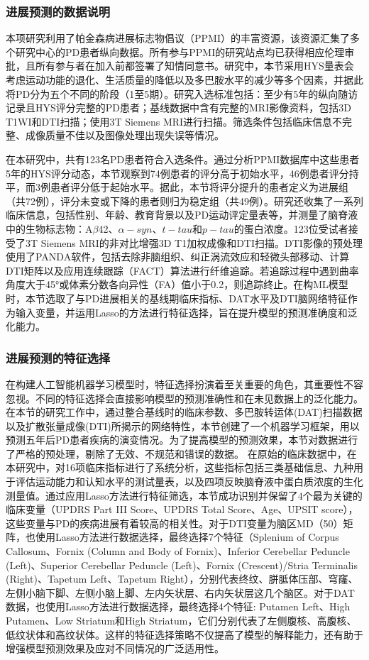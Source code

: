 \subsubsection{进展预测的数据说明}
本项研究利用了帕金森病进展标志物倡议（PPMI）的丰富资源，该资源汇集了多个研究中心的PD患者纵向数据。所有参与PPMI的研究站点均已获得相应伦理审批，且所有参与者在加入前都签署了知情同意书。研究中，本节采用HYS量表会考虑运动功能的退化、生活质量的降低以及多巴胺水平的减少等多个因素，并据此将PD分为五个不同的阶段（1至5期）。研究入选标准包括：至少有5年的纵向随访记录且HYS评分完整的PD患者；基线数据中含有完整的MRI影像资料，包括3D T1WI和DTI扫描；使用3T Siemens MRI进行扫描。筛选条件包括临床信息不完整、成像质量不佳以及图像处理出现失误等情况。

在本研究中，共有123名PD患者符合入选条件。通过分析PPMI数据库中这些患者5年的HYS评分动态，本节观察到74例患者的评分高于初始水平，46例患者评分持平，而3例患者评分低于起始水平。据此，本节将评分提升的患者定义为进展组（共72例），评分未变或下降的患者则归为稳定组（共49例）。研究还收集了一系列临床信息，包括性别、年龄、教育背景以及PD运动评定量表等，并测量了脑脊液中的生物标志物：A$\beta$42、$\alpha-syn$、$t-tau$和$p-tau$的蛋白浓度。123位受试者接受了3T Siemens MRI的非对比增强3D T1加权成像和DTI扫描。DTI影像的预处理使用了PANDA软件，包括去除非脑组织、纠正涡流效应和轻微头部移动、计算DTI矩阵以及应用连续跟踪（FACT）算法进行纤维追踪。若追踪过程中遇到曲率角度大于45°或体素分数各向异性（FA）值小于0.2，则追踪终止。在构ML模型时，本节选取了与PD进展相关的基线期临床指标、DAT水平及DTI脑网络特征作为输入变量，并运用Lasso的方法进行特征选择，旨在提升模型的预测准确度和泛化能力。


\subsubsection{进展预测的特征选择} 
在构建人工智能机器学习模型时，特征选择扮演着至关重要的角色，其重要性不容忽视。不同的特征选择会直接影响模型的预测准确性和在未见数据上的泛化能力。在本节的研究工作中，通过整合基线时的临床参数、多巴胺转运体(DAT)扫描数据以及扩散张量成像(DTI)所揭示的网络特性，本节创建了一个机器学习框架，用以预测五年后PD患者疾病的演变情况。为了提高模型的预测效果，本节对数据进行了严格的预处理，剔除了无效、不规范和错误的数据。
在原始的临床数据中，在本研究中，对16项临床指标进行了系统分析，这些指标包括三类基础信息、九种用于评估运动能力和认知水平的测试量表，以及四项反映脑脊液中蛋白质浓度的生化测量值。通过应用Lasso方法进行特征筛选，本节成功识别并保留了4个最为关键的临床变量（UPDRS Part III Score、UPDRS Total Score、Age、UPSIT score），这些变量与PD的疾病进展有着较高的相关性。对于DTI变量为脑区MD（50）矩阵，也使用Lasso方法进行数据选择，最终选择7个特征（Splenium of Corpus Callosum、Fornix (Column and Body of Fornix)、Inferior Cerebellar Peduncle (Left)、Superior Cerebellar Peduncle (Left)、Fornix (Crescent)/Stria Terminalis (Right)、Tapetum Left、Tapetum Right），分别代表终纹、胼胝体压部、穹窿、左侧小脑下脚、左侧小脑上脚、左内矢状层、右内矢状层这几个脑区。对于DAT数据，也使用Lasso方法进行数据选择，最终选择4个特征:
Putamen Left、High Putamen、Low Striatum和High Striatum，它们分别代表了左侧腹核、高腹核、低纹状体和高纹状体。这样的特征选择策略不仅提高了模型的解释能力，还有助于增强模型预测效果及应对不同情况的广泛适用性。




